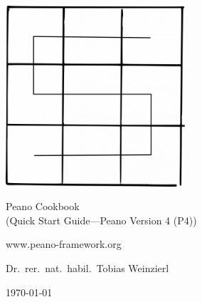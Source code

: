 
\begin{titlepage}

  \begin{center}

    \vspace{8cm}
  
    \includegraphics[width=0.5\textwidth]{Peano-logo.png}
 
    \vspace{1.5cm}

    {\Huge
      Peano Cookbook
    }
    \\
    (Quick Start Guide---Peano Version 4 (P4))
   
    \vspace{1cm}

     www.peano-framework.org
     
    \vspace{1.5cm}

     Dr.~rer.~nat.~habil.~Tobias Weinzierl
 
    \vspace{1.5cm}

    \today
  \end{center}


\end{titlepage}
